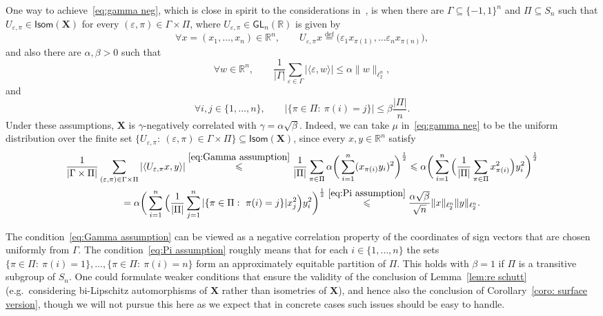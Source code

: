 \documentclass[11pt,reqno]{amsart}
\renewcommand{\le}{\leqslant}
\newcommand{\n}{\{1,\ldots,n\}}
\newcommand{\X}{\mathbf X}
\newcommand{\e}{\varepsilon}
\newcommand{\R}{\mathbb R}
\theoremstyle{remark}
\renewcommand{\subset}{\subseteq}
\newcommand{\eqdef}{\stackrel{\mathrm{def}}{=}}
\renewcommand{\1}{\mathbf 1}
\begin{document}
One way to achieve~\eqref{eq:gamma neg}, which is close in spirit to the considerations in~\cite{Sch89}, is when there are $\Gamma\subset \{-1,1\}^n$ and $\Pi\subset S_n$ such that $U_{\e,\pi}\in \mathsf{Isom}(\X)$ for every $(\e,\pi)\in \Gamma\times \Pi$, where $U_{\e,\pi}\in \mathsf{GL}_n(\R)$ is given by
$$
\forall x=(x_1,\ldots,x_n)\in \R^n,\qquad U_{\e,\pi}x\eqdef \big(\e_1x_{\pi(1)},\ldots\e_nx_{\pi(n)}\big),
$$
and also there are $\alpha,\beta>0$ such that
\begin{equation}\label{eq:Gamma assumption}
\forall w\in \R^n,\qquad \frac{1}{|\Gamma|}\sum_{\e\in \Gamma} |\langle \e, w\rangle|\le \alpha \|w\|_{\ell_2^n},
\end{equation}
and
\begin{equation}\label{eq:Pi assumption}
\forall i,j\in \n,\qquad |\{\pi\in \Pi:\ \pi(i)=j\}|\le \beta\frac{|\Pi|}{n}.
\end{equation}
Under these assumptions, $\X$ is $\gamma$-negatively correlated with $\gamma=\alpha\sqrt{\beta}$. Indeed, we can take $\mu$ in~\eqref{eq:gamma neg} to be the uniform distribution over the finite set $\{U_{\e,\pi}:\ (\e,\pi)\in \Gamma\times \Pi\}\subset \mathsf{Isom}(\X)$, since every $x,y\in \R^n$ satisfy
\begin{multline*}
\frac{1}{|\Gamma\times \Pi|}\sum_{(\e,\pi)\in \Gamma\times \Pi} |\langle U_{\e,\pi}x,y\rangle |\stackrel{\eqref{eq:Gamma assumption}}{\le} \frac{1}{|\Pi|} \sum_{\pi\in \Pi}\alpha \bigg(\sum_{i=1}^n (x_{\pi(i)}y_i)^2\bigg)^{\frac12}\le \alpha\bigg( \sum_{i=1}^n \Big(\frac{1}{|\Pi|} \sum_{\pi\in \Pi} x_{\pi(i)}^2\Big) y_i^2  \bigg)^{\frac12}\\=\alpha\bigg( \sum_{i=1}^n \Big(\frac{1}{|\Pi|} \sum_{j=1}^n |\{\pi\in \Pi:\ \pi(i)=j\}| x_{j}^2\Big) y_i^2  \bigg)^{\frac12}\stackrel{\eqref{eq:Pi assumption}}{\le} \frac{\alpha\sqrt{\beta}}{\sqrt{n}} \|x\|_{\ell_2^n}\|y\|_{\ell_2^n}.
\end{multline*}



The condition~\eqref{eq:Gamma assumption} can be viewed as a negative correlation property of the coordinates of sign vectors that are chosen uniformly from $\Gamma$.  The condition~\eqref{eq:Pi assumption} roughly means that for each $i\in \n$ the sets $\{\pi\in \Pi:\ \pi(i)=1\},\ldots,\{\pi\in \Pi:\ \pi(i)=n\}$ form an approximately equitable partition of $\Pi$. This holds with $\beta=1$  if $\Pi$ is a transitive subgroup of $S_n$. One could formulate weaker conditions that ensure the validity of the conclusion of Lemma~\ref{lem:re schutt} (e.g.~considering bi-Lipschitz automorphisms of $\X$ rather than isometries of $\X$), and hence also the conclusion of Corollary~\ref{coro: surface version}, though we will not pursue this here as we expect that in concrete cases such issues should be easy to handle.
\end{document}
